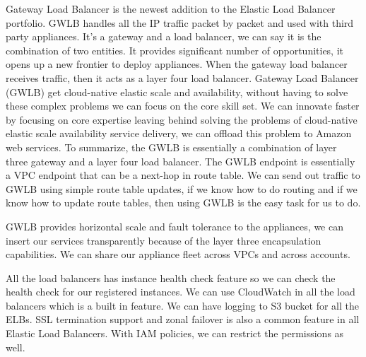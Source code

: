 Gateway Load Balancer is the newest addition to the Elastic Load Balancer portfolio. GWLB handles all the  IP traffic packet by packet and used with third party appliances. It's a gateway and a load balancer, we can say it is the combination of two entities. It provides significant number of opportunities, it opens up a new frontier to deploy appliances. When the gateway load balancer receives traffic, then it acts as a layer four load balancer. Gateway Load Balancer (GWLB) get cloud-native elastic scale and availability, without having to solve these complex problems we can focus on the core skill set. We can innovate faster by focusing on core expertise leaving behind solving the problems of cloud-native elastic scale availability service delivery, we can offload this problem to Amazon web services. To summarize, the GWLB is essentially a combination of layer three gateway and a layer four load balancer. The GWLB endpoint is essentially a VPC endpoint that can be a next-hop in route table. We can send out traffic to GWLB using simple route table updates, if we know how to do routing and if we know how to update route tables, then using GWLB is the easy task for us to do.

GWLB provides horizontal scale and fault tolerance to the appliances, we can insert our services transparently because of the layer three encapsulation capabilities. We can share our appliance fleet across VPCs and across accounts.


All the load balancers has instance health check feature so we can check the health check for our registered instances. We can use CloudWatch in all the load balancers which is a built in feature. We can have logging to S3 bucket for all the ELBs. SSL termination support and zonal failover is also a common feature in all Elastic Load Balancers. With IAM policies, we can restrict the permissions as well. 
